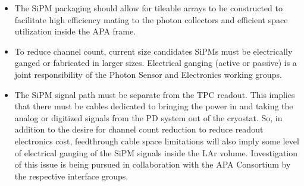 \begin{itemize}
\item The SiPM packaging should allow for tileable arrays to be constructed to facilitate high efficiency mating to the photon collectors and efficient space utilization inside the APA frame.

\item To reduce channel count, current size candidates SiPMs must be electrically ganged or fabricated in larger sizes. Electrical ganging (active or passive) is a joint responsibility of the Photon Sensor and Electronics working groups.

\item The SiPM signal path must be separate from the TPC readout. This implies that there must be cables dedicated to bringing the power
in and taking the analog or digitized signals from the PD system out of the cryostat. So, in addition to the desire for channel count reduction to reduce readout electronics cost, feedthrough cable space limitations will also imply some level of electrical ganging of the SiPM
signals inside the LAr volume. Investigation of this issue is being pursued in collaboration with the APA Consortium by the respective interface groups.
\end{itemize}

